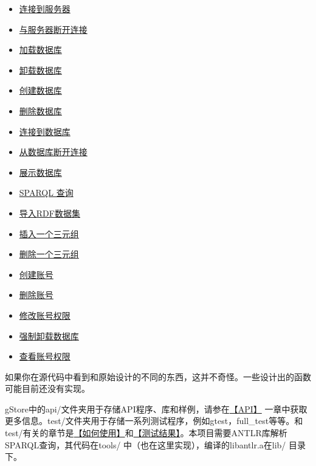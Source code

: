 \documentclass[titlepage, a4paper, 12pt]{article}
\begin{document}
\begin{itemize}
	\item
	\href{run:../jpg/A01-connectServer.jpg}{连接到服务器}
	\item
	\href{run:../jpg/A02-disconnectServer.jpg}{与服务器断开连接}
	\item
	\href{run:../jpg/A03-loadDatabase.jpg}{加载数据库}
	\item
	\href{run:../jpg/A04-unloadDatabase.jpg}{卸载数据库}
	\item
	\href{run:../jpg/A05-buildDatabase.jpg}{创建数据库}
	\item
	\href{run:../jpg/A06-deleteDatabase.jpg}{删除数据库}
	\item
	\href{run:../jpg/A07-connectDatabase.jpg}{连接到数据库}
	\item
	\href{run:../jpg/A08-disconnectDatabase.jpg}{从数据库断开连接}
	\item
	\href{run:../jpg/A09-showDatabase.jpg}{展示数据库}
	\item
	\href{run:../jpg/A10-querySPARQL.jpg}{SPARQL 查询}
	\item
	\href{run:../jpg/A11-loadRDF.jpg}{导入RDF数据集}
	\item
	\href{run:../jpg/A12-insertRDF.jpg}{插入一个三元组}
	\item
	\href{run:../jpg/A13-deleteRDF.jpg}{删除一个三元组}
	\item
	\href{run:../jpg/B01-createAccount.jpg}{创建账号}
	\item
	\href{run:../jpg/B02-deleteAccount.jpg}{删除账号}
	\item
	\href{run:../jpg/B03-changeAccount.jpg}{修改账号权限}
	\item
	\href{run:../jpg/B04-removeDatabase.jpg}{强制卸载数据库}
	\item
	\href{run:../jpg/B05-showAccount.jpg}{查看账号权限}
\end{itemize}

如果你在源代码中看到和原始设计的不同的东西，这并不奇怪。一些设计出的函数可能目前还没有实现。


gStore中的api/文件夹用于存储API程序、库和样例，请参在\hyperref[chapter05]{【API】} 一章中获取更多信息。test/文件夹用于存储一系列测试程序，例如gtest，full\_test等等。和test/有关的章节是\hyperref[chapter04]{【如何使用】}和\hyperref[chapter14]{【测试结果】}。本项目需要ANTLR库解析SPARQL查询，其代码在tools/ 中（也在这里实现），编译的libantlr.a在lib/ 目录下。
\end{document}
